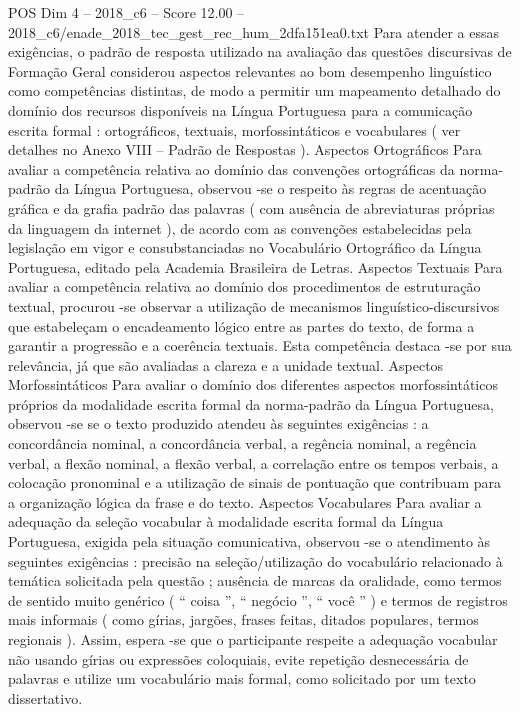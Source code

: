 \begin{textsample}{POS Dim 4 – 2018\_c6 – Score 12.00 – 2018\_c6/enade\_2018\_tec\_gest\_rec\_hum\_2dfa151ea0.txt}
Para atender a essas exigências, o padrão de resposta utilizado na avaliação das questões discursivas de Formação Geral considerou aspectos relevantes ao bom desempenho linguístico como competências distintas, de modo a permitir um mapeamento detalhado do domínio dos recursos disponíveis na Língua Portuguesa para a comunicação escrita formal : ortográficos, textuais, morfossintáticos e vocabulares ( ver detalhes no Anexo VIII – Padrão de Respostas ).
Aspectos Ortográficos Para avaliar a competência relativa ao domínio das convenções ortográficas da norma-padrão da Língua Portuguesa, observou -se o respeito às regras de acentuação gráfica e da grafia padrão das palavras ( com ausência de abreviaturas próprias da linguagem da internet ), de acordo com as convenções estabelecidas pela legislação em vigor e consubstanciadas no Vocabulário Ortográfico da Língua Portuguesa, editado pela Academia Brasileira de Letras.
Aspectos Textuais Para avaliar a competência relativa ao domínio dos procedimentos de estruturação textual, procurou -se observar a utilização de mecanismos linguístico-discursivos que estabeleçam o encadeamento lógico entre as partes do texto, de forma a garantir a progressão e a coerência textuais.
Esta competência destaca -se por sua relevância, já que são avaliadas a clareza e a unidade textual.
Aspectos Morfossintáticos Para avaliar o domínio dos diferentes aspectos morfossintáticos próprios da modalidade escrita formal da norma-padrão da Língua Portuguesa, observou -se se o texto produzido atendeu às seguintes exigências : a concordância nominal, a concordância verbal, a regência nominal, a regência verbal, a flexão nominal, a flexão verbal, a correlação entre os tempos verbais, a colocação pronominal e a utilização de sinais de pontuação que contribuam para a organização lógica da frase e do texto.
Aspectos Vocabulares Para avaliar a adequação da seleção vocabular à modalidade escrita formal da Língua Portuguesa, exigida pela situação comunicativa, observou -se o atendimento às seguintes exigências : precisão na seleção/utilização do vocabulário relacionado à temática solicitada pela questão ; ausência de marcas da oralidade, como termos de sentido muito genérico ( “ coisa ”, “ negócio ”, “ você ” ) e termos de registros mais informais ( como gírias, jargões, frases feitas, ditados populares, termos regionais ).
Assim, espera -se que o participante respeite a adequação vocabular não usando gírias ou expressões coloquiais, evite repetição desnecessária de palavras e utilize um vocabulário mais formal, como solicitado por um texto dissertativo.

\end{textsample}
